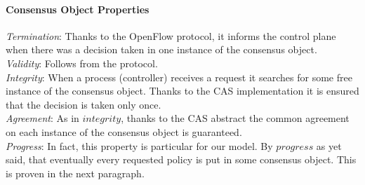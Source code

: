 \documentclass{article}
\theoremstyle{remark}
\begin{document}
\paragraph{Consensus Object Properties}
\emph{Termination}: Thanks to the OpenFlow protocol, it informs the control plane when there was a decision taken in one instance of the consensus object. 
\\
\emph{Validity}: Follows from the protocol.
\\
\emph{Integrity}: When a process (controller) receives a request it searches for some free instance of the consensus object. Thanks to the CAS implementation it is ensured that the decision is taken only once.
\\
\emph{Agreement}: As in $integrity$, thanks to the CAS abstract the common agreement on each instance of the consensus object is guaranteed.
\\
\emph{Progress}: In fact, this property is particular for our model. By $progress$ as yet said, that eventually every requested policy is put in some consensus object. This is proven in the next paragraph.
\end{document}
